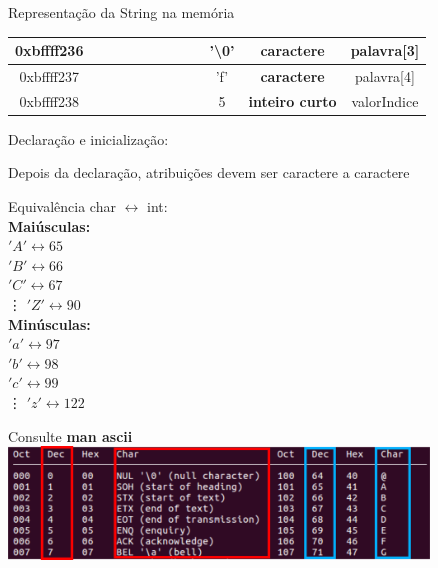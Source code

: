 \documentclass[portuguese,10pt,xcolor=table]{bredelebeamer}
\begin{document}
\begin{frame}{Representação da String na memória}
\begin{table}
\begin{tabular}{|@{\hskip 0.1cm}c@{\hskip 0.1cm}|c|c|c|c|c|c|c|c|c|c|@{\hskip 0.1cm}c@{\hskip 0.1cm}|}
					0xbffff236 & \BN[0]&\BN[0]&\BN[0]&\BN[0]&\BN[0]&\BN[0]&\BN[0]&\BN[0]& '\textbackslash 0' & \textbf{caractere} & palavra[3]\\\hline
					0xbffff237 & \BN[0]&\BN[1]&\BN[1]&\BN[0]&\BN[0]&\BN[1]&\BN[1]&\BN[0]& 'f' & \textbf{caractere} & palavra[4]\\\hline
					0xbffff238 & \GN[0]&\GN[0]&\GN[0]&\GN[0]&\GN[0]&\GN[1]&\GN[0]&\GN[1]& 5 & \textbf{inteiro curto} & valorIndice\\\hline
				\end{tabular}
			\end{table}
			\normalsize
		\end{frame}
		
		\begin{frame} 
			Declaração e inicialização:
			
			Depois da declaração, atribuições devem ser caractere a caractere
		\end{frame}

		\begin{frame} 
			Equivalência char $\leftrightarrow$ int:\\

			\textbf{Maiúsculas:}\\
			$'A' \leftrightarrow 65$\\
			$'B' \leftrightarrow 66$\\
			$'C' \leftrightarrow 67$\\
			\vdots
			$'Z' \leftrightarrow 90$\\
		
			\textbf{Minúsculas:}\\
			$'a' \leftrightarrow 97$\\
			$'b' \leftrightarrow 98$\\
			$'c' \leftrightarrow 99$\\
			\vdots
			$'z' \leftrightarrow 122$\\
			
		\end{frame}

		\begin{frame} 
			Consulte \textbf{man ascii}\\
		\includegraphics[height=3.0cm]{ascii.png}
		\end{frame}
\end{document}
